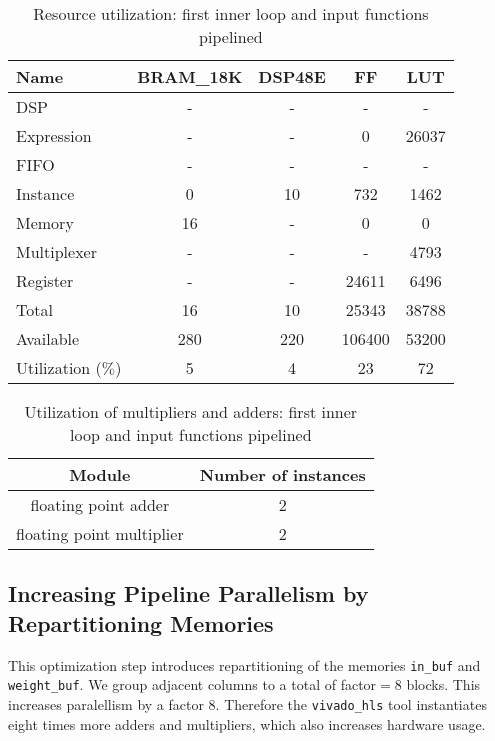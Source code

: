 \documentclass{article}
\begin{document}
\begin{enumerate}
	\begin{table}[H]
		\centering
		\begin{tabular}{lcccc}
			Name      & BRAM\_18K& DSP48E&   FF   &  LUT  \\
			\hline
			DSP              &        -&      -&       -&      -    \\
			Expression       &        -&      -&       0&  26037    \\
			FIFO             &        -&      -&       -&      -    \\
			Instance         &        0&     10&     732&   1462    \\
			Memory           &       16&      -&       0&      0    \\
			Multiplexer      &        -&      -&       -&   4793    \\
			Register         &        -&      -&   24611&   6496    \\
			\hline                                                  
			Total            &       16&     10&   25343&  38788    \\
			Available        &      280&    220&  106400&  53200    \\
			\hline                                                  
			Utilization ($\%$)  &        5&      4&      23&     72 
		\end{tabular}
		\caption{Resource utilization: first inner loop and input functions pipelined}
		\label{1-b-resources-3}
	\end{table}

	\begin{table}[H]
		\centering
		\begin{tabular}{cc}
			Module & Number of instances \\
			\hline
			floating point adder & 2 \\
			floating point multiplier & 2
		\end{tabular}
		\caption{Utilization of multipliers and adders: first inner loop and input functions pipelined}
		\label{1-b-resources-arithmetic-3}
	\end{table}

\end{enumerate}

\subsection{Increasing Pipeline Parallelism by Repartitioning Memories}
\label{1-c}
This optimization step introduces repartitioning of the memories \texttt{in\_buf} and \texttt{weight\_buf}. We group adjacent columns to a total of factor$=8$ blocks. This increases paralellism by a factor 8. Therefore the \texttt{vivado\_hls} tool instantiates eight times more adders and multipliers, which also increases hardware usage. 
\end{document}
